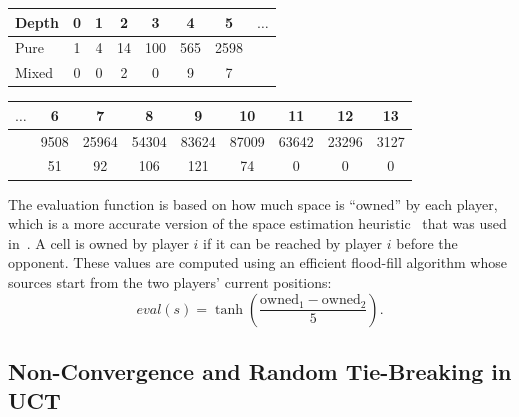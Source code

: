\vspace{0.1cm}

\begin{center}
\small
\begin{flushleft}
\begin{tabular}{|l|c|c|c|c|c|c|c|}
\hline Depth & 0 & 1 & 2 & 3 & 4 & 5 & $\ldots$\\
\hline Pure  & 1 & 4 & 14 & 100 & 565 & 2598 & \\
\hline Mixed & 0 & 0 & 2 & 0 & 9 & 7 & \\
\hline
\end{tabular}
\end{flushleft}
\begin{flushright}
\begin{tabular}{|c|c|c|c|c|c|c|c|c|}
\hline  $\ldots$ & 6 & 7 & 8 & 9 & 10 & 11 & 12 & 13\\
\hline  & 9508 & 25964 & 54304 & 83624 & 87009 & 63642 & 23296 & 3127\\
\hline  & 51 & 92 & 106 & 121 & 74 & 0 & 0 & 0 \\
\hline
\end{tabular}
\end{flushright}
\end{center}

\vspace{0.1cm}

The evaluation function is based on how much space is ``owned'' by each player, which is a more accurate version of the space estimation 
heuristic~\cite{DenTeuling12Tron} that was used in~\cite{Lanctot13Tron}. A cell is owned by player $i$ if it can be reached
by player $i$ before the opponent. These values are computed using an efficient flood-fill algorithm whose sources start from the two players' 
current positions:
\[
eval(s) = \tanh\left(\frac{\textrm{owned}_1 - \textrm{owned}_2}{5}\right).
\]


\subsection{Non-Convergence and Random Tie-Breaking in UCT}\label{sec:exp:brps} 

